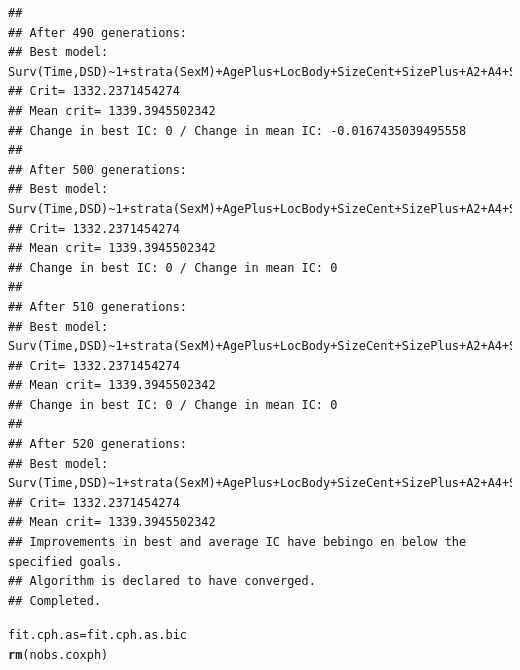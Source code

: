 \documentclass{article}\usepackage[]{graphicx}\usepackage[]{color}
\makeatletter
\newcommand{\hlstd}[1]{\textcolor[rgb]{0.345,0.345,0.345}{#1}}%
\newcommand{\hlkwb}[1]{\textcolor[rgb]{0.69,0.353,0.396}{#1}}%
\newcommand{\hlkwd}[1]{\textcolor[rgb]{0.737,0.353,0.396}{\textbf{#1}}}%
\newenvironment{kframe}{%
 \def\at@end@of@kframe{}%
 \ifinner\ifhmode%
  \def\at@end@of@kframe{\end{minipage}}%
  \begin{minipage}{\columnwidth}%
 \fi\fi%
 \def\FrameCommand##1{\hskip\@totalleftmargin \hskip-\fboxsep
 \colorbox{shadecolor}{##1}\hskip-\fboxsep
     \hskip-\linewidth \hskip-\@totalleftmargin \hskip\columnwidth}%
 \MakeFramed {\advance\hsize-\width
   \@totalleftmargin\z@ \linewidth\hsize
   \@setminipage}}%
 {\par\unskip\endMakeFramed%
 \at@end@of@kframe}
\newenvironment{knitrout}{}{} %
\makeatother
\begin{document}
\begin{knitrout}
\begin{kframe}
{\ttfamily\noindent\color{warningcolor}{\#\# Warning in fitter(X, Y, strats, offset, init, control, weights = weights, : Loglik converged before variable\ \ 8 ; beta may be infinite.}}\begin{verbatim}
## 
## After 490 generations:
## Best model: Surv(Time,DSD)~1+strata(SexM)+AgePlus+LocBody+SizeCent+SizePlus+A2+A4+SizeCent:LocBody+A2:SizeCent+strata(SexM):AgePlus+strata(SexM):SizePlus
## Crit= 1332.2371454274
## Mean crit= 1339.3945502342
## Change in best IC: 0 / Change in mean IC: -0.0167435039495558
## 
## After 500 generations:
## Best model: Surv(Time,DSD)~1+strata(SexM)+AgePlus+LocBody+SizeCent+SizePlus+A2+A4+SizeCent:LocBody+A2:SizeCent+strata(SexM):AgePlus+strata(SexM):SizePlus
## Crit= 1332.2371454274
## Mean crit= 1339.3945502342
## Change in best IC: 0 / Change in mean IC: 0
## 
## After 510 generations:
## Best model: Surv(Time,DSD)~1+strata(SexM)+AgePlus+LocBody+SizeCent+SizePlus+A2+A4+SizeCent:LocBody+A2:SizeCent+strata(SexM):AgePlus+strata(SexM):SizePlus
## Crit= 1332.2371454274
## Mean crit= 1339.3945502342
## Change in best IC: 0 / Change in mean IC: 0
## 
## After 520 generations:
## Best model: Surv(Time,DSD)~1+strata(SexM)+AgePlus+LocBody+SizeCent+SizePlus+A2+A4+SizeCent:LocBody+A2:SizeCent+strata(SexM):AgePlus+strata(SexM):SizePlus
## Crit= 1332.2371454274
## Mean crit= 1339.3945502342
## Improvements in best and average IC have bebingo en below the specified goals.
## Algorithm is declared to have converged.
## Completed.
\end{verbatim}
\begin{alltt}
\hlstd{fit.cph.as} \hlkwb{=} \hlstd{fit.cph.as.bic}
\hlkwd{rm}\hlstd{(nobs.coxph)}
\end{alltt}
\end{kframe}
\end{knitrout}
\end{document}

